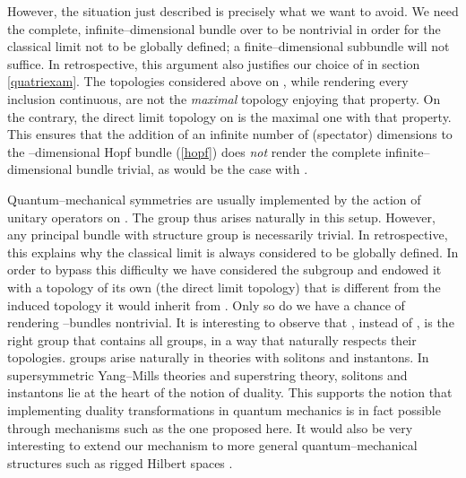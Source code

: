 \documentclass[a4paper,a4paper]{article}
\begin{document}
However, the situation just described is precisely what we want to avoid. 
We need the complete, infinite--dimensional bundle over \coordHE{} to be nontrivial 
in order for the classical limit not to be globally defined; a 
finite--dimensional subbundle will not suffice. In retrospective, this argument
also justifies our choice of \coordHE{} in section \ref{quatriexam}. The 
topologies considered above on \coordHE{}, while rendering every inclusion \coordHE{} continuous, are not the {\it maximal} topology enjoying that 
property. On the contrary, the direct limit topology on \coordHE{} is the maximal 
one with that property. This ensures that the addition of an infinite 
number of (spectator) dimensions to the \coordHE{}--dimensional Hopf bundle (\ref{hopf}) 
does {\it not} render the complete infinite--dimensional bundle trivial,
as would be the case with \coordHE{}.

Quantum--mechanical symmetries are usually implemented by the action of 
unitary operators on \coordHE{}. The group \coordHE{} thus arises naturally 
in this setup. However, any principal bundle with structure group 
\coordHE{} is necessarily trivial. In retrospective, this explains 
why the classical limit is always considered to be globally defined. 
In order to bypass this difficulty we have considered the subgroup 
\coordHE{} and endowed it with a topology of its own 
(the direct limit topology) that is different from the induced topology 
it would inherit from \coordHE{}. Only so do we have a chance of 
rendering \coordHE{}--bundles nontrivial. It is interesting to observe that
\coordHE{}, instead of \coordHE{}, is the right group that contains all \coordHE{} groups, 
in a way that naturally respects their topologies. \coordHE{} groups arise 
naturally in theories with solitons and instantons.
In supersymmetric Yang--Mills theories and superstring theory, solitons and instantons 
lie at the heart of the notion of duality. This supports the notion that implementing 
duality transformations in quantum mechanics is in fact possible through mechanisms 
such as the one proposed here. It would also be very interesting to extend our mechanism 
to more general quantum--mechanical structures such as rigged Hilbert spaces \cite{GADELLA}. 
\end{document}
